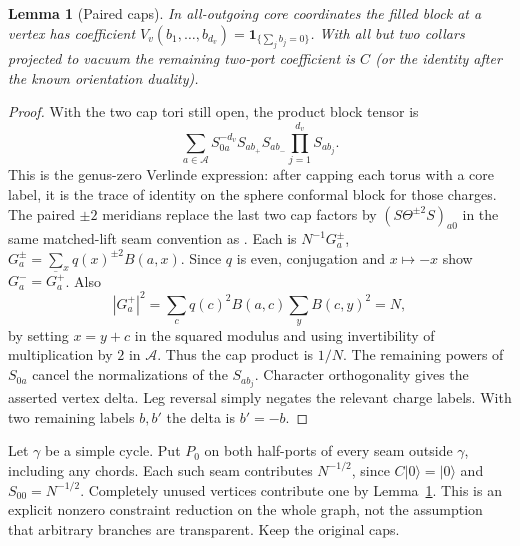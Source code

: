 \documentclass[11pt]{article}
\newtheorem{lemma}[theorem]{Lemma}
\begin{document}
\begin{lemma}[Paired caps]\label{lem:vertex}
In all-outgoing core coordinates the filled block at a vertex has coefficient
\(V_v(b_1,\ldots,b_{d_v})=\mathbf 1_{\{\sum_j b_j=0\}}\).
With all but two collars projected to vacuum the remaining two-port coefficient is \(C\) (or the identity after the known orientation duality).
\end{lemma}
\begin{proof}
With the two cap tori still open, the product block tensor is
\[
 \sum_{a\in\mathcal A} S_{0a}^{-d_v}S_{ab_+}S_{ab_-}
                                      \prod_{j=1}^{d_v} S_{ab_j}.
\]
This is the genus-zero Verlinde expression: after capping each torus with a core label, it is the trace of identity on the sphere conformal block for those charges. The paired \(\pm2\) meridians replace the last two cap factors by \((S\Theta^{\pm2}S)_{a0}\) in the same matched-lift seam convention as \cite{p50b}. Each is \(N^{-1}G_a^\pm\), \(G_a^\pm=\sum_x q(x)^{\pm2}B(a,x)\). Since \(q\) is even, conjugation and \(x\mapsto-x\) show \(G_a^-=\overline{G_a^+}\). Also
\[
 |G_a^+|^2=\sum_c q(c)^2 B(a,c)
                 \sum_y B(c,y)^2=N ,
\]
by setting \(x=y+c\) in the squared modulus and using invertibility of multiplication by \(2\) in \(\mathcal A\). Thus the cap product is \(1/N\). The remaining powers of \(S_{0a}\) cancel the normalizations of the \(S_{ab_j}\). Character orthogonality gives the asserted vertex delta. Leg reversal simply negates the relevant charge labels. With two remaining labels \(b,b'\) the delta is \(b'=-b\).
\end{proof}

Let \(\gamma\) be a simple cycle. Put \(P_0\) on both half-ports of every seam outside \(\gamma\), including any chords. Each such seam contributes \(N^{-1/2}\), since \(C|0\rangle=|0\rangle\) and \(S_{00}=N^{-1/2}\). Completely unused vertices contribute one by Lemma~\ref{lem:vertex}. This is an explicit nonzero constraint reduction on the whole graph, not the assumption that arbitrary branches are transparent. Keep the original caps.
\end{document}
